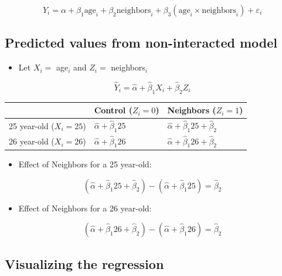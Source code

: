 \documentclass[
]{article}
\providecommand{\tightlist}{%
  \setlength{\itemsep}{0pt}\setlength{\parskip}{0pt}}
\begin{document}
\[
Y_i = \alpha + \beta_1\text{age}_i + \beta_2 \text{neighbors}_i + \beta_3 (\text{age}_i \times \text{neighbors}_i) + \varepsilon_i
\]

\subsection{Predicted values from non-interacted
model}\label{predicted-values-from-non-interacted-model}

\begin{itemize}
\tightlist
\item
  Let \(X_i =\) age\(_i\) and \(Z_i =\) neighbors\(_i\)
\end{itemize}

\[
\hat{Y}_i = \hat{\alpha} + \hat{\beta}_1 X_i + \hat{\beta}_2 Z_i 
\]

\begin{center}
\begin{tabular}{ r | l  l }
 & Control ($Z_i = 0$) & Neighbors ($Z_i = 1$) \\
\hline
25 year-old ($X_i = 25$)  & $\hat{\alpha} + \hat{\beta}_1 25$ &  $\hat{\alpha} + \hat{\beta}_1 25 + \hat{\beta}_2$ \\
26 year-old ($X_i = 26$) & $\hat{\alpha} + \hat{\beta}_1 26$ &  $\hat{\alpha} + \hat{\beta}_1 26 + \hat{\beta}_2$\\
\end{tabular}
\end{center}

\begin{itemize}
\item Effect of Neighbors for a 25 year-old:
\end{itemize}\vspace{-5pt}

\[
(\hat{\alpha} + \hat{\beta}_1 25 + \hat{\beta}_2) - (\hat{\alpha} + \hat{\beta}_1 25) = \hat{\beta}_2
\]

\vspace{-5pt}

\begin{itemize}
\item Effect of Neighbors for a 26 year-old:
\end{itemize}\vspace{-5pt}

\[
(\hat{\alpha} + \hat{\beta}_1 26 + \hat{\beta}_2) - (\hat{\alpha} + \hat{\beta}_1 26) = \hat{\beta}_2
\]

\subsection{Visualizing the
regression}\label{visualizing-the-regression}
\end{document}
